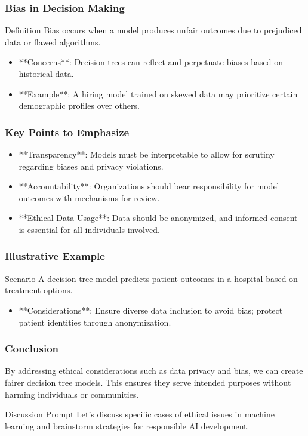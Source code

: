 \documentclass[aspectratio=169]{beamer}
\begin{document}
\begin{frame}[fragile]
  \frametitle{Bias in Decision Making}
  \begin{block}{Definition}
    Bias occurs when a model produces unfair outcomes due to prejudiced data or flawed algorithms.
  \end{block}
  \begin{itemize}
    \item **Concerns**: Decision trees can reflect and perpetuate biases based on historical data.
    \item **Example**: A hiring model trained on skewed data may prioritize certain demographic profiles over others.
  \end{itemize}
\end{frame}

\begin{frame}[fragile]
  \frametitle{Key Points to Emphasize}
  \begin{itemize}
    \item **Transparency**: Models must be interpretable to allow for scrutiny regarding biases and privacy violations.
    \item **Accountability**: Organizations should bear responsibility for model outcomes with mechanisms for review.
    \item **Ethical Data Usage**: Data should be anonymized, and informed consent is essential for all individuals involved.
  \end{itemize}
\end{frame}

\begin{frame}[fragile]
  \frametitle{Illustrative Example}
  \begin{block}{Scenario}
    A decision tree model predicts patient outcomes in a hospital based on treatment options.
  \end{block}
  \begin{itemize}
    \item **Considerations**: Ensure diverse data inclusion to avoid bias; protect patient identities through anonymization.
  \end{itemize}
\end{frame}

\begin{frame}[fragile]
  \frametitle{Conclusion}
  By addressing ethical considerations such as data privacy and bias, we can create fairer decision tree models. This ensures they serve intended purposes without harming individuals or communities.
  
  \begin{block}{Discussion Prompt}
    Let's discuss specific cases of ethical issues in machine learning and brainstorm strategies for responsible AI development.
  \end{block}
\end{frame}
\end{document}
